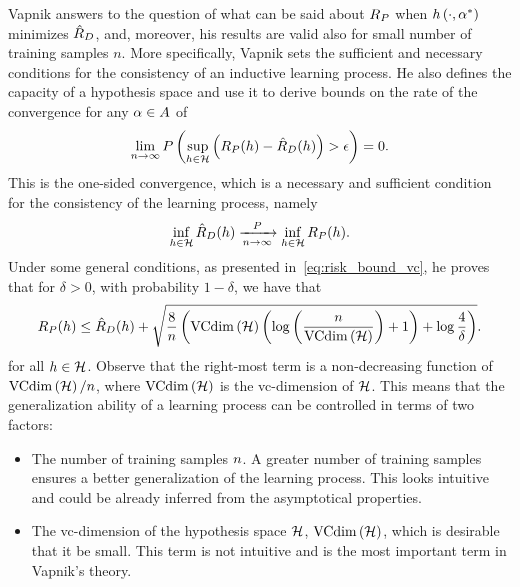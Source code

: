 Vapnik answers to the question of what can be said about $R_P$ when $h\left(\cdot, \alpha^*\right)$ minimizes $\hat{R}_{D}$, and, moreover, his results are valid also for small number of training samples $n$.
More specifically, Vapnik sets the sufficient and necessary conditions for the consistency of an inductive learning process.
 He also defines the capacity of a hypothesis space and use it to derive bounds on the rate of the convergence for any $\alpha \in A$ of
 \begin{equation}
    \nonumber
    \lim_{n \to \infty} P\left(\sup_{h \in \mathcal{H}} \left(R_P(h) - \hat{R}_{D}(h) \right) > \epsilon \right) = 0.
\end{equation}
This is the one-sided convergence, which is a necessary and sufficient condition for the consistency of the learning process, namely
\begin{equation}
    \nonumber
    \inf_{h \in \mathcal{H}} \hat{R}_{D}(h) \xrightarrow[n \to \infty]{P} \inf_{h \in \mathcal{H}} R_P(h) .
\end{equation}
Under some general conditions, as presented in~\eqref{eq:risk_bound_vc}, he proves that for $\delta > 0$, with probability $1- \delta$, we have that
\begin{equation}
    \label{eq:ordinary_generalization_bound}
    \exprisk(\hypf) \leq \emprisk(\hypf) + \sqrt{\frac{8}{\nsamples} \left(\vcdim{\hypspace} \left(\log\left(\frac{\nsamples}{\vcdim{\hypspace}}\right) + 1 \right) + \log \frac{4}{\delta} \right)} .
\end{equation}
for all $h \in \mathcal{H}$.
Observe that the right-most term is a non-decreasing function of $\operatorname{VCdim}\left(\mathcal{H}\right)/n$, where $\operatorname{VCdim}\left(\mathcal{H}\right)$ is the \acrshort{vc}-dimension of $\mathcal{H}$. This means that the generalization ability of a learning process can be controlled in terms of two factors:
\begin{itemize}
    \item The number of training samples $n$. A greater number of training samples ensures a better generalization of the learning process. This looks intuitive and could be already inferred from the asymptotical properties. 
    \item The \acrshort{vc}-dimension of the hypothesis space $\mathcal{H}$, $\operatorname{VCdim}\left(\mathcal{H}\right)$, which is desirable that it be small. This term is not intuitive and is the most important term in Vapnik's theory.
\end{itemize}
